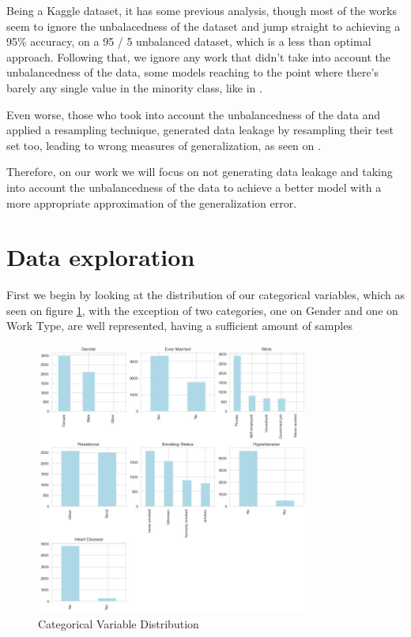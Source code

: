 \documentclass[11pt, a4paper]{article}
\begin{document}
Being a Kaggle dataset, it has some previous analysis, though most of the works seem to ignore the unbalacedness of the dataset and jump straight to achieving a 95\% accuracy, on a 95 / 5 unbalanced dataset, which is a less than optimal approach. Following that, we ignore any work that didn't take into account the unbalancedness of the data, some models reaching to the point where there's barely any single value in the minority class, like in  \cite{mariahchristy_2021}. 

Even worse, those who took into account the unbalancedness of the data and applied a resampling technique, generated data leakage by resampling their test set too, leading to wrong measures of generalization, as seen on \cite{paytonfisher_2021}.

Therefore, on our work we will focus on not generating data leakage and taking into account the unbalancedness of the data to achieve a better model with a more appropriate approximation of the generalization error.


\section{Data exploration}

First we begin by looking at the distribution of our categorical variables, which as seen on figure \ref{fig:categoricalVariables}, with the exception of two categories, one on Gender and one on Work Type, are well represented, having a sufficient amount of samples

\begin{figure}[H]
    \centering
    \includegraphics[width=0.8\textwidth]{images/catDest.jpg}
    \caption{Categorical Variable Distribution}
    \label{fig:categoricalVariables}
\end{figure}
\end{document}
